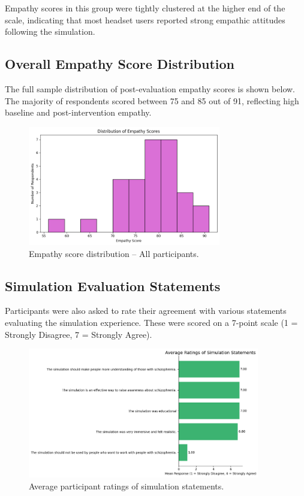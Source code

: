 Empathy scores in this group were tightly clustered at the higher end of the scale, indicating that most headset users reported strong empathic attitudes following the simulation.

\subsection{Overall Empathy Score Distribution}

The full sample distribution of post-evaluation empathy scores is shown below. The majority of respondents scored between 75 and 85 out of 91, reflecting high baseline and post-intervention empathy.

\begin{figure}[H]
    \centering
    \includegraphics[width=0.75\textwidth]{../../Figures/empathy-score-post-all.png}
    \caption{Empathy score distribution – All participants.}
    \label{fig:empathy_all_post}
\end{figure}

\subsection{Simulation Evaluation Statements}

Participants were also asked to rate their agreement with various statements evaluating the simulation experience. These were scored on a 7-point scale (1 = Strongly Disagree, 7 = Strongly Agree).

\begin{figure}[H]
    \centering
    \includegraphics[width=0.9\textwidth]{../../Figures/simulation-evaluation-post.png}
    \caption{Average participant ratings of simulation statements.}
    \label{fig:simulation_evaluation_post}
\end{figure}

